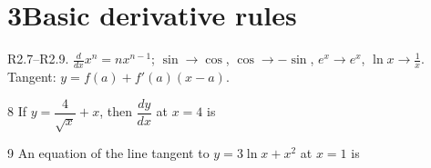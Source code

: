 \documentclass{apcalc}
\begin{document}
\section*{3\quad Basic derivative rules}
\begin{setrule}R2.7–R2.9. $\frac{d}{dx}x^n=nx^{n-1}$; $\sin\to\cos$, $\cos\to-\sin$, $e^x\to e^x$, $\ln x\to\frac1x$. Tangent: $y=f(a)+f'(a)(x-a)$.\end{setrule}
\begin{q}{8}
If $y=\dfrac{4}{\sqrt{x}}+x$, then $\dfrac{dy}{dx}$ at $x=4$ is
\end{q}
\begin{q}{9}
An equation of the line tangent to $y=3\ln x+x^2$ at $x=1$ is
\end{q}
\end{document}
